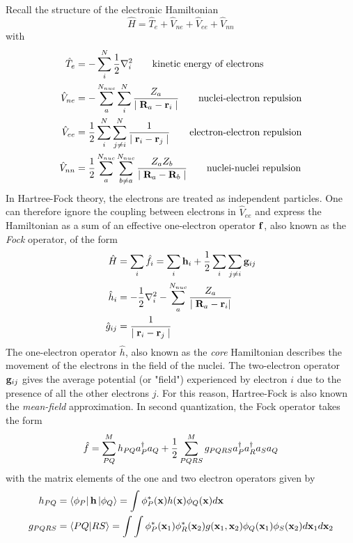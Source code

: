 Recall the structure of the electronic Hamiltonian
\begin{equation}
\hat{H} = \hat{T}_e + \hat{V}_{ne} + \hat{V}_{ee} + \hat{V}_{nn}
\end{equation}
\noindent with
\begin{align}
\hat{T}_e &= -\sum_i^N \frac{1}{2} \nabla_i^2 \qquad \textrm{kinetic energy of electrons} \\
\hat{V}_{ne} &= -\sum_a^{N_{nuc}} \sum_i^N \frac{Z_a}{\mid\mathbf{R}_a - \mathbf{r}_i\mid} \qquad \textrm{nuclei-electron repulsion} \\
\hat{V}_{ee} &= \frac{1}{2} \sum^N_i \sum^N_{j \neq i} \frac{1}{\mid \mathbf{r}_i - \mathbf{r}_j\mid} \qquad \textrm{electron-electron repulsion} \\
\hat{V}_{nn} &= \frac{1}{2}\sum_a^{N_{nuc}} \sum_{b \neq a}^{N_{nuc}} \frac{Z_a Z_b}{\mid \mathbf{R}_a - \mathbf{R}_b \mid} \qquad \textrm{nuclei-nuclei repulsion} 
\end{align}
\noindent In Hartree-Fock theory, the electrons are treated as independent particles. One can therefore ignore the coupling between electrons in $\hat{V}_{ee}$ and express the Hamiltonian as a sum of an effective one-electron operator $\mathbf{f}$, also known as the \emph{Fock} operator, of the form
\begin{align}
\hat{H} &= \sum_i \hat{f}_i =  \sum_i \mathbf{h}_i + \frac{1}{2} \sum_i \sum_{j \neq i} \mathbf{g}_{ij} \\
\hat{h}_i &= -\frac{1}{2}\nabla_i^2 - \sum_a^{N_{nuc}} \frac{Z_a}{\mid \mathbf{R}_a - \mathbf{r}_i |} \\
\hat{g}_{ij} &= \frac{1}{\mid \mathbf{r}_i - \mathbf{r}_j \mid}
\end{align}
\noindent The one-electron operator $\hat{h}$, also known as the \emph{core} Hamiltonian describes the movement of the electrons in the field of the nuclei. The two-electron operator $\mathbf{g}_{ij}$ gives the average potential (or "field") experienced by electron $i$ due to the presence of all the other electrons $j$. For this reason, Hartree-Fock is also known the \emph{mean-field} approximation. In second quantization, the Fock operator takes the form
\begin{equation}
\hat{f} = \sum^{M}_{PQ} h_{PQ} a^{\dagger}_P a_Q + \frac{1}{2} \sum^{M}_{PQRS} g_{PQRS} a^{\dagger}_P a^{\dagger}_R a_S a_Q
\label{eq:FOCK2Q}
\end{equation}
\noindent with the matrix elements of the one and two electron operators given by
\begin{align}
h_{PQ} &= \bra{\phi_P} \mathbf{h} \ket{\phi_Q} = \int \phi_P^*(\mathbf{x}) h(\mathbf{x}) \phi_Q(\mathbf{x}) d\mathbf{x} \\
g_{PQRS} &= \bra{PQ}\ket{RS} = \int\int \phi_P^*(\mathbf{x}_1) \phi^*_R(\mathbf{x}_2) g(\mathbf{x}_1,\mathbf{x}_2) \phi_Q(\mathbf{x}_1) \phi_S(\mathbf{x}_2) d\mathbf{x}_1 d\mathbf{x}_2
\end{align} 
